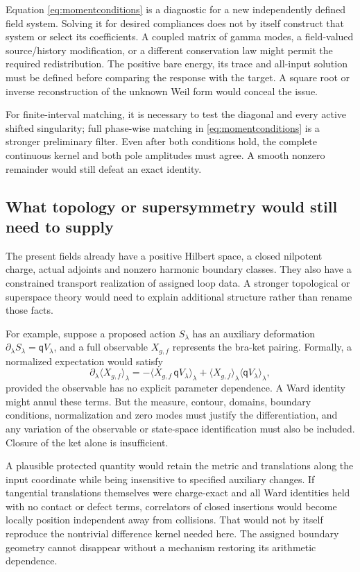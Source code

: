 \documentclass[11pt]{article}
\numberwithin{equation}{section}
\theoremstyle{definition}
\theoremstyle{remark}
\newcommand{\qq}{\mathsf q}
\begin{document}
Equation \eqref{eq:momentconditions} is a diagnostic for a new independently defined field system. Solving it for desired compliances does not by itself construct that system or select its coefficients. A coupled matrix of gamma modes, a field-valued source/history modification, or a different conservation law might permit the required redistribution. The positive bare energy, its trace and all-input solution must be defined before comparing the response with the target. A square root or inverse reconstruction of the unknown Weil form would conceal the issue.

For finite-interval matching, it is necessary to test the diagonal and every active shifted singularity; full phase-wise matching in \eqref{eq:momentconditions} is a stronger preliminary filter. Even after both conditions hold, the complete continuous kernel and both pole amplitudes must agree. A smooth nonzero remainder would still defeat an exact identity.

\subsection{What topology or supersymmetry would still need to supply}
The present fields already have a positive Hilbert space, a closed nilpotent charge, actual adjoints and nonzero harmonic boundary classes. They also have a constrained transport realization of assigned loop data. A stronger topological or superspace theory would need to explain additional structure rather than rename those facts.

For example, suppose a proposed action $S_\lambda$ has an auxiliary deformation $\partial_\lambda S_\lambda=\qq V_\lambda$, and a full observable $X_{g,f}$ represents the bra-ket pairing. Formally, a normalized expectation would satisfy
\begin{equation}
 \partial_\lambda\langle X_{g,f}\rangle_\lambda
 =-\langle X_{g,f}\,\qq V_\lambda\rangle_\lambda
 +\langle X_{g,f}\rangle_\lambda\langle\qq V_\lambda\rangle_\lambda,
\end{equation}
provided the observable has no explicit parameter dependence. A Ward identity might annul these terms. But the measure, contour, domains, boundary conditions, normalization and zero modes must justify the differentiation, and any variation of the observable or state-space identification must also be included. Closure of the ket alone is insufficient.

A plausible protected quantity would retain the metric and translations along the input coordinate while being insensitive to specified auxiliary changes. If tangential translations themselves were charge-exact and all Ward identities held with no contact or defect terms, correlators of closed insertions would become locally position independent away from collisions. That would not by itself reproduce the nontrivial difference kernel needed here. The assigned boundary geometry cannot disappear without a mechanism restoring its arithmetic dependence.
\end{document}
